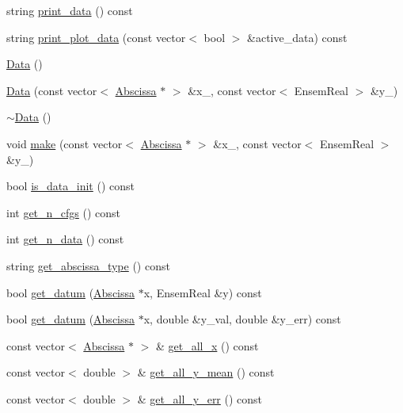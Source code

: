 \begin{DoxyCompactItemize}
string \mbox{\hyperlink{classData_a255a7abe193d5dfbd77fb957942bda64}{print\+\_\+data}} () const
\item 
string \mbox{\hyperlink{classData_a9dd9812c56754c985d50e9a5fc855320}{print\+\_\+plot\+\_\+data}} (const vector$<$ bool $>$ \&active\+\_\+data) const
\item 
\mbox{\hyperlink{classData_af11f741cb7f587e2e495452a8905a22a}{Data}} ()
\item 
\mbox{\hyperlink{classData_a9f1ea96cc98b80ed3778ff5818cb91f8}{Data}} (const vector$<$ \mbox{\hyperlink{classAbscissa}{Abscissa}} $\ast$ $>$ \&x\+\_\+, const vector$<$ Ensem\+Real $>$ \&y\+\_\+)
\item 
\mbox{\hyperlink{classData_aab31956423290f0d62dcca47ab4d16dd}{$\sim$\+Data}} ()
\item 
void \mbox{\hyperlink{classData_acf9b4e6e52730e9da47d82bda61ac1ca}{make}} (const vector$<$ \mbox{\hyperlink{classAbscissa}{Abscissa}} $\ast$ $>$ \&x\+\_\+, const vector$<$ Ensem\+Real $>$ \&y\+\_\+)
\item 
bool \mbox{\hyperlink{classData_a804a4d59e6211aa54a629b31ad66cbd4}{is\+\_\+data\+\_\+init}} () const
\item 
int \mbox{\hyperlink{classData_a1ac2adcf6c6717759f820eceed4b55e4}{get\+\_\+n\+\_\+cfgs}} () const
\item 
int \mbox{\hyperlink{classData_a1ec16adf40ee062d8d75b33acfe156d5}{get\+\_\+n\+\_\+data}} () const
\item 
string \mbox{\hyperlink{classData_aeb6b453e589d11d200e711fbd7501e8f}{get\+\_\+abscissa\+\_\+type}} () const
\item 
bool \mbox{\hyperlink{classData_ad7e50542712441af6ad2a227193a777f}{get\+\_\+datum}} (\mbox{\hyperlink{classAbscissa}{Abscissa}} $\ast$x, Ensem\+Real \&y) const
\item 
bool \mbox{\hyperlink{classData_aab2d2ba01acb88ede5beb3ab54053d73}{get\+\_\+datum}} (\mbox{\hyperlink{classAbscissa}{Abscissa}} $\ast$x, double \&y\+\_\+val, double \&y\+\_\+err) const
\item 
const vector$<$ \mbox{\hyperlink{classAbscissa}{Abscissa}} $\ast$ $>$ \& \mbox{\hyperlink{classData_a79204577812567531adde90797885b3e}{get\+\_\+all\+\_\+x}} () const
\item 
const vector$<$ double $>$ \& \mbox{\hyperlink{classData_a5b3bba18a4893fc7cb415beaed1ef859}{get\+\_\+all\+\_\+y\+\_\+mean}} () const
\item 
const vector$<$ double $>$ \& \mbox{\hyperlink{classData_ad4988122408ff487d5f891a9b04b3c83}{get\+\_\+all\+\_\+y\+\_\+err}} () const

\end{DoxyCompactItemize}
